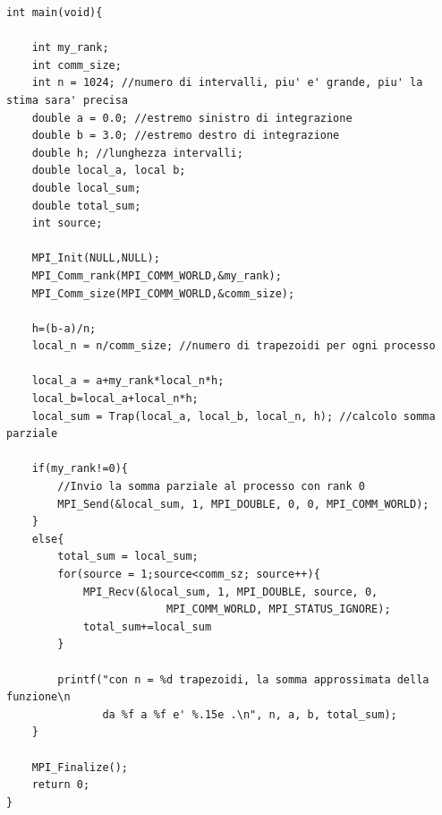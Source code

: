 \documentclass[10pt, letterpaper]{report}
\begin{document}
\begin{lstlisting}[style=CStyle]
int main(void){

    int my_rank; 
    int comm_size;
    int n = 1024; //numero di intervalli, piu' e' grande, piu' la stima sara' precisa 
    double a = 0.0; //estremo sinistro di integrazione
    double b = 3.0; //estremo destro di integrazione
    double h; //lunghezza intervalli; 
    double local_a, local b;
    double local_sum;
    double total_sum;
    int source;

    MPI_Init(NULL,NULL);
    MPI_Comm_rank(MPI_COMM_WORLD,&my_rank);
    MPI_Comm_size(MPI_COMM_WORLD,&comm_size);

    h=(b-a)/n; 
    local_n = n/comm_size; //numero di trapezoidi per ogni processo 

    local_a = a+my_rank*local_n*h;
    local_b=local_a+local_n*h;
    local_sum = Trap(local_a, local_b, local_n, h); //calcolo somma parziale

    if(my_rank!=0){
        //Invio la somma parziale al processo con rank 0
        MPI_Send(&local_sum, 1, MPI_DOUBLE, 0, 0, MPI_COMM_WORLD);
    }
    else{
        total_sum = local_sum;
        for(source = 1;source<comm_sz; source++){
            MPI_Recv(&local_sum, 1, MPI_DOUBLE, source, 0,
                         MPI_COMM_WORLD, MPI_STATUS_IGNORE);
            total_sum+=local_sum
        }

        printf("con n = %d trapezoidi, la somma approssimata della funzione\n  
               da %f a %f e' %.15e .\n", n, a, b, total_sum);
    }

    MPI_Finalize();
    return 0;
}
\end{lstlisting}
\end{document}
